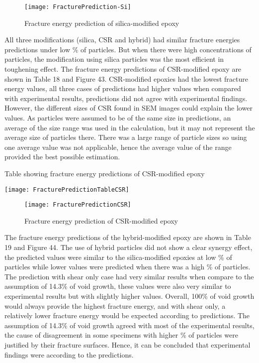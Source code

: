 \documentclass[numbers=noendperiod,chapterprefix=on]{icldt} %
\begin{document}
\begin{figure}[!htpb]
\centering
\texttt{[image: FracturePrediction-Si]}
\caption{Fracture energy prediction of silica-modified epoxy}
\end{figure}
\FloatBarrier

All three modifications (silica, CSR and hybrid) had similar fracture energies predictions under low \% of particles. But when there were high concentrations of particles, the modification using silica particles was the most efficient in toughening effect. 
The fracture energy predictions of CSR-modified epoxy are shown in Table 18 and Figure 43. CSR-modified epoxies had the lowest fracture energy values, all three cases of predictions had higher values when compared with experimental results, predictions did not agree with experimental findings. However, the different sizes of CSR found in SEM images could explain the lower values. As particles were assumed to be of the same size in predictions, an average of the size range was used in the calculation, but it may not represent the average size of particles there. There was a large range of particle sizes so using one average value was not applicable, hence the average value of the range provided the best possible estimation.

\begin{table}[!htpb]
\centering
\caption{Table showing fracture energy predictions of CSR-modified epoxy} %
\texttt{[image: FracturePredictionTableCSR]}
\end{table}
\FloatBarrier

\begin{figure}[!htpb]
\centering
\texttt{[image: FracturePredictionCSR]}
\caption{Fracture energy prediction of CSR-modified epoxy}
\end{figure}
\FloatBarrier

The fracture energy predictions of the hybrid-modified epoxy are shown in Table 19 and Figure 44. The use of hybrid particles did not show a clear synergy effect, the predicted values were similar to the silica-modified epoxies at low \% of particles while lower values were predicted when there was a high \% of particles. The prediction with shear only case had very similar results when compare to the assumption of 14.3\% of void growth, these values were also very similar to experimental results but with slightly higher values.
Overall, 100\% of void growth would always provide the highest fracture energy, and with shear only, a relatively lower fracture energy would be expected according to predictions. The assumption of 14.3\% of void growth agreed with most of the experimental results, the cause of disagreement in some specimens with higher \% of particles were justified by their fracture surfaces. Hence, it can be concluded that experimental findings were according to the predictions. 
\end{document}
